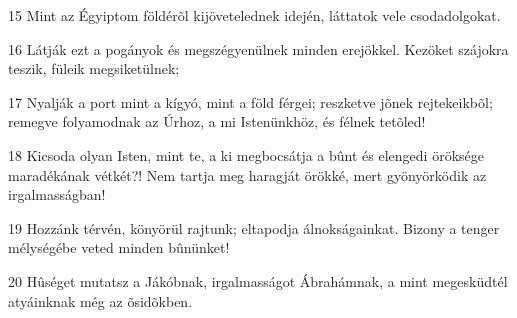 \par 15 Mint az Égyiptom földérõl kijövetelednek idején, láttatok vele csodadolgokat.
\par 16 Látják ezt a pogányok és megszégyenülnek minden erejökkel. Kezöket szájokra teszik, füleik megsiketülnek;
\par 17 Nyalják a port mint a kígyó, mint a föld férgei; reszketve jõnek rejtekeikbõl; remegve folyamodnak az Úrhoz, a mi Istenünkhöz, és félnek tetõled!
\par 18 Kicsoda olyan Isten, mint te, a ki megbocsátja a bûnt és elengedi öröksége maradékának vétkét?! Nem tartja meg haragját örökké, mert gyönyörködik az irgalmasságban!
\par 19 Hozzánk térvén, könyörül rajtunk; eltapodja álnokságainkat. Bizony a tenger mélységébe veted minden bûnünket!
\par 20 Hûséget mutatsz a Jákóbnak, irgalmasságot Ábrahámnak, a mint megesküdtél atyáinknak még az õsidõkben.


